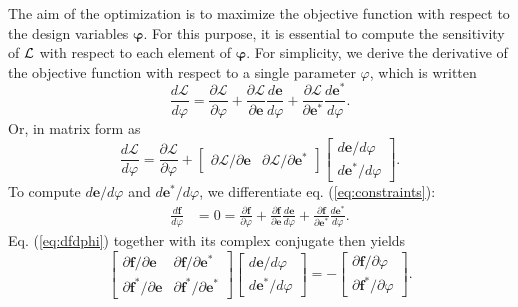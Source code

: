 The aim of the optimization is to maximize the objective function with respect to the design variables $\bm{\varphi}$. For this purpose, it is essential to compute the sensitivity of $\mathcal{L}$ with respect to each element of $\bm{\varphi}$.  For simplicity, we derive the derivative of the objective function with respect to a single parameter $\varphi$, which is written
%
\begin{equation}
\frac{d\mathcal{L}}{d\varphi} = \frac{\partial\mathcal{L}}{\partial\varphi} + \frac{\partial\mathcal{L}}{\partial\mathbf{e}}\frac{d\mathbf{e}}{d\varphi} + \frac{\partial\mathcal{L}}{\partial\mathbf{e}^*}\frac{d\mathbf{e}^*}{d\varphi}.
\end{equation}
%
Or, in matrix form as
\begin{equation}
\frac{d\mathcal{L}}{d\varphi} = \frac{\partial\mathcal{L}}{\partial\varphi} + 
\begin{bmatrix}
\partial\mathcal{L} / \partial\mathbf{e} &
\partial\mathcal{L} / \partial\mathbf{e}^*
\end{bmatrix}
\begin{bmatrix}
d\mathbf{e} / d\varphi \\ d\mathbf{e}^* / d\varphi
\end{bmatrix}.
\label{eq:dLdphi_matrix}
\end{equation}
To compute $d\mathbf{e}/d\varphi$ and $d\mathbf{e}^*/d\varphi$, we differentiate eq. (\ref{eq:constraints}):
%
\begin{align}
\frac{d\mathbf{f}}{d\varphi} &= 0 = \frac{\partial \mathbf{f}}{\partial \varphi} + \frac{\partial \mathbf{f}}{\partial \mathbf{e}}\frac{d \mathbf{e}}{d\varphi} + \frac{\partial \mathbf{f}}{\partial \mathbf{e}^*}\frac{d \mathbf{e}^*}{d\varphi}. \label{eq:dfdphi}
\end{align}
%
Eq. (\ref{eq:dfdphi}) together with its complex conjugate then yields
%
\begin{equation}
\begin{bmatrix}
\partial \mathbf{f} / \partial \mathbf{e} &
\partial \mathbf{f} / \partial \mathbf{e}^* \\
\partial \mathbf{f}^* / \partial \mathbf{e} &
\partial \mathbf{f}^* / \partial \mathbf{e}^*
\end{bmatrix}
\begin{bmatrix}
d\mathbf{e} / d\varphi \\ d\mathbf{e}^* / d\varphi
\end{bmatrix} = -\begin{bmatrix}
\partial \mathbf{f} / \partial \varphi \\ \partial \mathbf{f}^* / \partial \varphi
\end{bmatrix}.
\end{equation}
